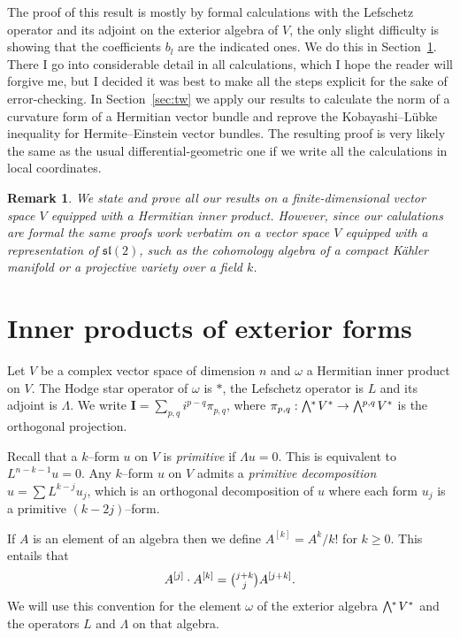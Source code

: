 \documentclass[11pt,a4paper]{amsart}
\def\^#1{^{[#1]}}
\def\bw#1{\bigwedge{}^{\mkern-5mu #1}\mkern2mu}
\def\I{\mathbf{I}}
\theoremstyle{slthm}
\theoremstyle{sldef}
\theoremstyle{slrem}
\newtheorem*{rema}{Remark}
\numberwithin{equation}{section}
\begin{document}
The proof of this result is mostly by formal calculations with the
Lefschetz operator and its adjoint on the exterior algebra of $V$, the
only slight difficulty is showing that the coefficients $b_l$ are the
indicated ones. We do this in Section~\ref{sec:on}. There I go into
considerable detail in all calculations, which I hope the reader will
forgive me, but I decided it was best to make all the steps explicit for
the sake of error-checking.  In Section~\ref{sec:tw} we apply our results to
calculate the norm of a curvature form of a Hermitian vector bundle and
reprove the Kobayashi--L\"{u}bke inequality for Hermite--Einstein vector
bundles. The resulting proof is very likely the same as the usual
differential-geometric one if we write all the calculations in local
coordinates.

\begin{rema}
We state and prove all our results on a
finite-dimensional vector space $V$ equipped with a Hermitian inner
product. However, since our calulations are formal the same proofs work 
verbatim on a vector space $V$ equipped with a representation of
$\mathfrak{sl}(2)$, such as the cohomology algebra of a compact
K\"ahler manifold or a projective variety over a field $k$.
\end{rema}





\section{Inner products of exterior forms}
\label{sec:on}



Let $V$ be a complex vector space of dimension $n$ and $\omega$ a Hermitian
inner product on $V$. The Hodge star operator of $\omega$ is $*$,
the Lefschetz operator is $L$ and its adjoint is $\Lambda$. We write
$\I = \sum_{p,q} i^{p-q} \pi_{p,q}$, where $\pi_{p,q} : \bw{*} V^* \to
\bw{p,q} V^*$ is the orthogonal projection.

Recall that a $k$--form $u$ on $V$ is \emph{primitive} if $\Lambda u = 0$.
This is equivalent to $L^{n-k-1}u = 0$. Any $k$--form $u$ on $V$ admits a
\emph{primitive decomposition} $u = \sum L^{k-j} u_j$, which is an
orthogonal decomposition of $u$ where each form $u_j$ is a primitive
$(k-2j)$--form.

If $A$ is an element of an algebra then we define $A\^k = A^k / k!$ for $k
\geq 0$. This entails that
$$
A\^j \cdot A\^k = \tbinom{j+k}{j} A\^{j+k}.
$$
We will use this convention for the element $\omega$ of the exterior
algebra $\bw{*} V^*$ and the operators $L$ and $\Lambda$ on that
algebra.
\end{document}
